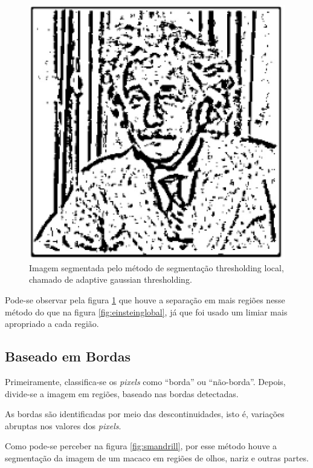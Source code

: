   \begin{figure}[!htb]
       \begin{center}  
          \includegraphics[width=0.3\columnwidth]{img/einstein-localthresholding-adaptivegausian.jpg}
           \caption{\label{fig:einsteinlocal}Imagem segmentada pelo método de segmentação thresholding local, chamado de adaptive gaussian  thresholding.}
       \end{center}
   \end{figure}
   
   Pode-se observar pela figura \ref{fig:einsteinlocal} que houve a separação em mais regiões nesse método do que na figura \ref{fig:einsteinglobal}, já que foi usado um limiar mais apropriado a cada região.

\subsection{Baseado em Bordas}
Primeiramente, classifica-se os \textit{pixels} como “borda” ou “não-borda”.
Depois, divide-se a imagem em regiões, baseado nas bordas detectadas.

As bordas são identificadas por meio das descontinuidades, isto é, variações abruptas nos valores dos \textit{pixels}. 

Como pode-se perceber na figura \ref{fig:smandrill}, por esse método houve a segmentação da imagem de um macaco em regiões de olhos, nariz e outras partes. 

